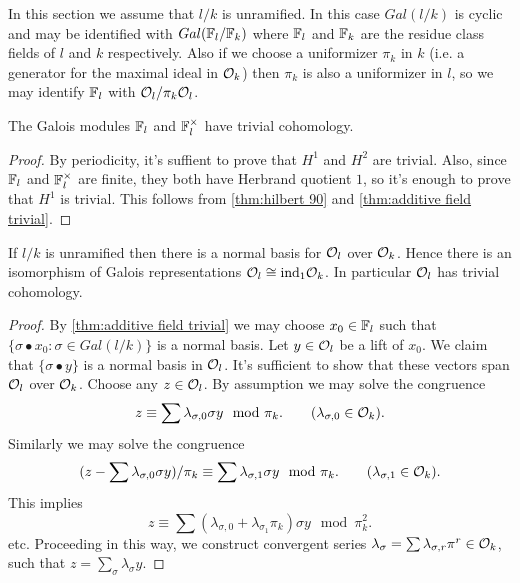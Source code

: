 In this section we assume that $l/k$ is unramified.
In this case $Gal(l/k)$ is cyclic and may be identified with $Gal({\mathbb F}_l / {\mathbb F}_k)$ where
${\mathbb F}_l$ and ${\mathbb F}_k$ are the residue class fields of $l$ and $k$ respectively.
Also if we choose a uniformizer $\pi_k$ in $k$ (i.e. a generator for the maximal ideal in ${\mathcal O}_k$)
then $\pi_k$ is also a uniformizer in $l$, so we may identify ${\mathbb F}_l$ with ${\mathcal O}_l / \pi_k {\mathcal O}_l$.

\begin{lemma} \label{lem:finite field trivial}
	The Galois modules ${\mathbb F}_l$ and ${\mathbb F}_l^\times$ have trivial cohomology.
\end{lemma}

\begin{proof}
	By periodicity, it's suffient to prove that $H^1$ and $H^2$ are trivial.
	Also, since ${\mathbb F}_l$ and ${\mathbb F}_l^\times$ are finite, they both have Herbrand quotient $1$,
	so it's enough to prove that $H^1$ is trivial.
	This follows from \ref{thm:hilbert 90} and \ref{thm:additive field trivial}.
\end{proof}


\begin{lemma} \label{lem:unramified additive trivial}
	If $l/k$ is unramified then there is a normal basis for ${\mathcal O}_l$ over ${\mathcal O}_k$.
	Hence there is an isomorphism of Galois representations ${\mathcal O}_l \cong \mathrm{ind}_1 {\mathcal O}_k$.
	In particular ${\mathcal O}_l$ has trivial cohomology.
\end{lemma}

\begin{proof}
	By \ref{thm:additive field trivial}
	we may choose $x_0 \in {\mathbb F}_l$
	such that $\{\sigma \bullet x_0 :\sigma \in Gal(l/k)\}$ is a normal basis.
	Let $y \in {\mathcal O}_l$ be a lift of $x_0$.
	We claim that $\{\sigma \bullet y\}$ is a normal basis
	in ${\mathcal O}_l$. It's sufficient to show that these vectors span ${\mathcal O}_l$ over ${\mathcal O}_k$.
	Choose any $z \in {\mathcal O}_l$. By assumption we may solve the congruence
	\[
		z \equiv \sum \lambda_{\sigma,0} \sigma y \mod \pi_k.
		\qquad
		(\lambda_{\sigma,0} \in {\mathcal O}_k).
	\]
	Similarly we may solve the congruence
	\[
		(z - \sum \lambda_{\sigma,0} \sigma y) / \pi_k \equiv \sum \lambda_{\sigma,1} \sigma y \mod \pi_k.
		\qquad
		(\lambda_{\sigma,1} \in {\mathcal O}_k).
	\]
	This implies
	\[
		z \equiv \sum (\lambda_{\sigma,0} + \lambda_{\sigma_1} \pi_k) \sigma y \mod \pi_k^2.
	\]
	etc.
	Proceeding in this way, we construct convergent series
	$\lambda_{\sigma} = \sum \lambda_{\sigma,r}\pi^r \in {\mathcal O}_k$,
	such that $z = \sum_\sigma \lambda_\sigma y$.
\end{proof}




